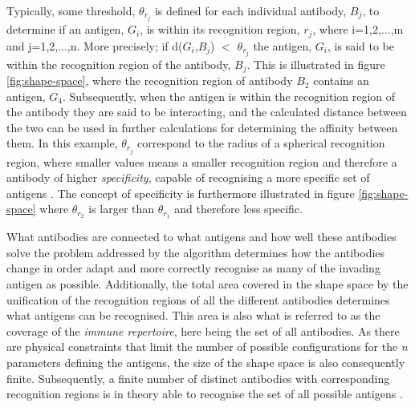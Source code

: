 Typically, some threshold, $\theta_{r_j}$ is defined for each individual antibody, $B_{j}$, to determine if an antigen, $G_{i}$, is within its recognition region, $r_{j}$, where i=1,2,...,m and j=1,2,...,n. More precisely; if d($G_{i}$,$B_{j}$) $<$ $\theta_{r_j}$ the antigen, $G_{i}$, is said to be within the recognition region of the antibody, $B_{j}$. This is illustrated in figure \ref{fig:shape-space}, where the recognition region of antibody $B_{2}$ contains an antigen, $G_{4}$. Subsequently, when the antigen is within the recognition region of the antibody they are said to be interacting, and the calculated distance between the two can be used in further calculations for determining the affinity between them. In this example, $\theta_{r_j}$ correspond to the radius of a spherical recognition region, where smaller values means a smaller recognition region and therefore a antibody of higher \textit{specificity}, capable of recognising a more specific set of antigens \cite{floreano2008bio}. The concept of specificity is furthermore illustrated in figure \ref{fig:shape-space} where $\theta_{r_2}$ is larger than $\theta_{r_1}$ and therefore less specific. 

What antibodies are connected to what antigens and how well these antibodies solve the problem addressed by the algorithm determines how the antibodies change in order adapt and more correctly recognise as many of the invading antigen as possible. Additionally, the total area covered in the shape space by the unification of the recognition regions of all the different antibodies determines what antigens can be recognised. This area is also what is referred to as the coverage of the \textit{immune repertoire}, here being the set of all antibodies. As there are physical constraints that limit the number of possible configurations for the \textit{n} parameters defining the antigens, the size of the shape space is also consequently finite. Subsequently, a finite number of distinct antibodies with corresponding recognition regions is in theory able to recognise the set of all possible antigens \cite{floreano2008bio}. 



